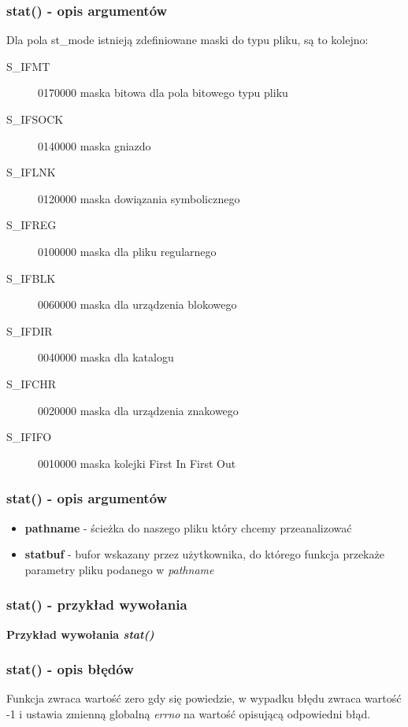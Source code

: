 \documentclass{beamer}
\begin{document}
\begin{frame}
	\frametitle{stat() - opis argumentów}
Dla pola st\_mode istnieją zdefiniowane maski do typu pliku, są to kolejno:
\begin{description}
\item[S\_IFMT]	0170000	maska bitowa dla pola bitowego typu pliku
\item[S\_IFSOCK]0140000	maska gniazdo
\item[S\_IFLNK]	0120000	maska dowiązania symbolicznego
\item[S\_IFREG]	0100000	maska dla pliku regularnego
\item[S\_IFBLK]	0060000	maska dla urządzenia blokowego
\item[S\_IFDIR]	0040000	maska dla katalogu
\item[S\_IFCHR]	0020000	maska dla urządzenia znakowego
\item[S\_IFIFO]	0010000	maska kolejki First In First Out
\end{description}
\end{frame}

\begin{frame}
	\frametitle{stat() - opis argumentów}
\begin{itemize}
\item \textbf{pathname} - ścieżka do naszego pliku który chcemy przeanalizować
\item \textbf{statbuf} - bufor wskazany przez użytkownika, do którego funkcja przekaże parametry pliku podanego w \textit{pathname}
\end{itemize}
\end{frame}


\begin{frame}
\frametitle{stat() - przykład wywołania}
\textbf{Przykład wywołania \textit{stat()}}
\lststat
\end{frame}



\begin{frame}
	\frametitle{stat() - opis błędów}
Funkcja zwraca wartość zero gdy się powiedzie, w wypadku błędu zwraca wartość -1 i ustawia zmienną globalną \textit{errno} na wartość opisującą odpowiedni błąd.
\end{frame}
\end{document}
